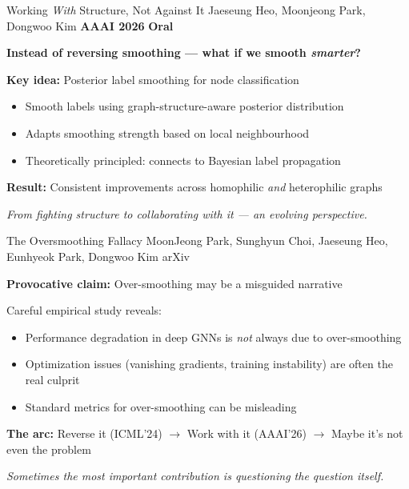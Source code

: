 \documentclass[aspectratio=169,11pt]{beamer}
\newcommand{\papercite}[1]{{\scriptsize\color{mutedText}#1}}
\newcommand{\venue}[1]{{\small\textcolor{postechBlue}{\textbf{#1}}}}
\newcommand{\badge}[1]{\colorbox{anuGold}{\scriptsize\color{white}\textbf{#1}}}
\begin{document}
\begin{frame}{Working \textit{With} Structure, Not Against It}
  \papercite{Jaeseung Heo, Moonjeong Park, Dongwoo Kim \hfill \venue{AAAI 2026} \badge{Oral}}
  \vspace{8pt}

  \textbf{Instead of reversing smoothing --- what if we smooth \textit{smarter}?}
  \vspace{6pt}

  \textbf{Key idea:} \alert{Posterior} label smoothing for node classification
  \begin{itemize}
    \item Smooth labels using graph-structure-aware posterior distribution
    \item Adapts smoothing strength based on local neighbourhood
    \item Theoretically principled: connects to Bayesian label propagation
  \end{itemize}
  \vspace{8pt}

  \textbf{Result:} Consistent improvements across homophilic \textit{and} heterophilic graphs

  \vspace{4pt}
  {\small\textit{From fighting structure to collaborating with it --- an evolving perspective.}}
\end{frame}

\begin{frame}{The Oversmoothing Fallacy}
  \papercite{MoonJeong Park, Sunghyun Choi, Jaeseung Heo, Eunhyeok Park, Dongwoo Kim \hfill {\small\color{mutedText}arXiv}}
  \vspace{8pt}

  \textbf{Provocative claim:} Over-smoothing may be a \alert{misguided narrative}
  \vspace{6pt}

  Careful empirical study reveals:
  \begin{itemize}
    \item Performance degradation in deep GNNs is \textit{not} always due to over-smoothing
    \item Optimization issues (vanishing gradients, training instability) are often the real culprit
    \item Standard metrics for over-smoothing can be misleading
  \end{itemize}
  \vspace{8pt}

  \textbf{The arc:} Reverse it (ICML'24) $\to$ Work with it (AAAI'26) $\to$ Maybe it's not even the problem

  \vspace{4pt}
  {\small\textit{Sometimes the most important contribution is questioning the question itself.}}
\end{frame}
\end{document}
